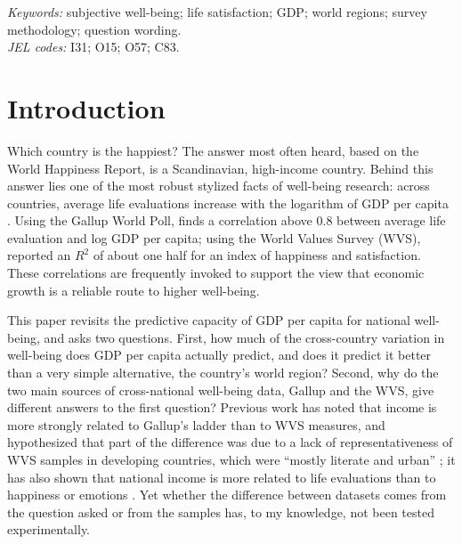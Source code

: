 \documentclass[12pt]{article}
\begin{document}
\noindent\textit{Keywords:} subjective well-being; life satisfaction; GDP; world regions; survey methodology; question wording.\\
\noindent\textit{JEL codes:} I31; O15; O57; C83.

\clearpage
\endgroup



\section{Introduction}\label{sec:intro}

Which country is the happiest? The answer most often heard, based on the World Happiness Report, is a Scandinavian, high-income country. Behind this answer lies one of the most robust stylized facts of well-being research: across countries, average life evaluations increase with the logarithm of GDP per capita \citep{deaton_income_2008,stevenson_economic_2008,sacks_new_2012}. Using the Gallup World Poll, \citet{deaton_income_2008} finds a correlation above 0.8 between average life evaluation and log GDP per capita; using the World Values Survey (WVS), \citet{inglehart_genes_2000} reported an $R^2$ of about one half for an index of happiness and satisfaction. These correlations are frequently invoked to support the view that economic growth is a reliable route to higher well-being.

This paper revisits the predictive capacity of GDP per capita for national well-being, and asks two questions. First, how much of the cross-country variation in well-being does GDP per capita actually predict, and does it predict it better than a very simple alternative, the country's world region? Second, why do the two main sources of cross-national well-being data, Gallup and the WVS, give different answers to the first question? Previous work has noted that income is more strongly related to Gallup's ladder than to WVS measures, and hypothesized that part of the difference was due to a lack of representativeness of WVS samples in developing countries, which were ``mostly literate and urban'' \citep{deaton_income_2008}; it has also shown that national income is more related to life evaluations than to happiness or emotions \citep{inglehart_development_2008,kahneman_high_2010}. Yet whether the difference between datasets comes from the question asked or from the samples has, to my knowledge, not been tested experimentally.
\end{document}
